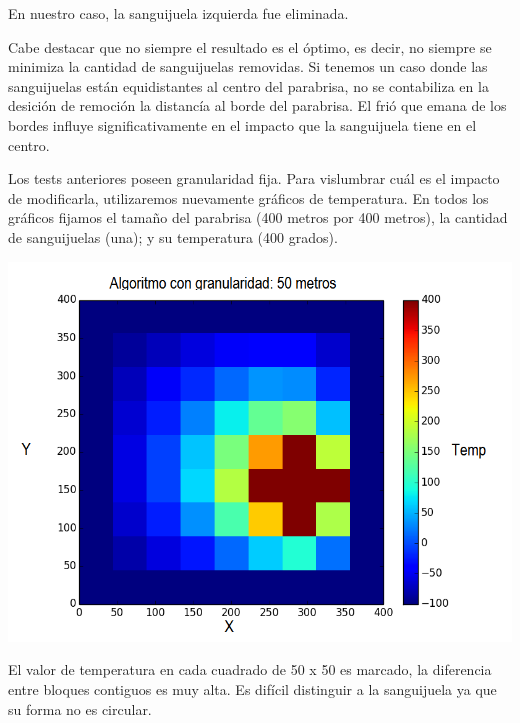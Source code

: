 	En nuestro caso, la sanguijuela izquierda fue eliminada.

	Cabe destacar que no siempre el resultado es el óptimo, es decir, no siempre se minimiza la cantidad de sanguijuelas removidas. Si tenemos un caso donde las sanguijuelas están equidistantes al centro del parabrisa, no se contabiliza en la desición de remoción la distancía al borde del parabrisa. El frió que emana de los bordes influye significativamente en el impacto que la sanguijuela tiene en el centro.

	Los tests anteriores poseen granularidad fija. Para vislumbrar cuál es el impacto de modificarla, utilizaremos nuevamente gráficos de temperatura. En todos los gráficos fijamos el tamaño del parabrisa (400 metros por 400 metros), la cantidad de sanguijuelas (una); y su temperatura (400 grados).

	\begin{center}
		\includegraphics[width=\textwidth]{./img/granularidad/g50_t400_sinkill.png}
	\end{center}

	El valor de temperatura en cada cuadrado de 50 x 50 es marcado, la diferencia entre bloques contiguos es muy alta. Es difícil distinguir a la sanguijuela ya que su forma no es circular.


